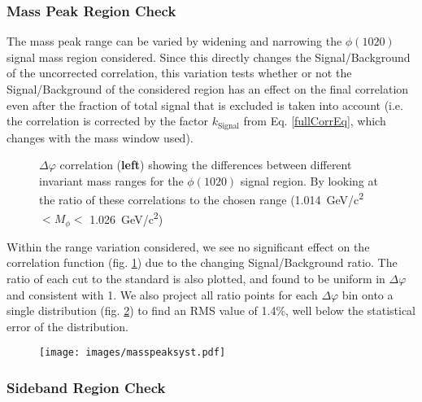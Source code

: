 \documentclass[ALICE,manyauthors]{ALICE_analysis_notes}
\begin{document}
\subsubsection{Mass Peak Region Check} 

The mass peak range can be varied by widening and narrowing the $\phi(1020)$ signal mass region considered. Since this directly changes the Signal/Background of the uncorrected correlation, this variation tests whether or not the Signal/Background of the considered region has an effect on the final correlation even after the fraction of total signal that is excluded is taken into account (i.e. the correlation is corrected by the factor $k_{\text{Signal}}$ from Eq. \ref{fullCorrEq}, which changes with the mass window used).

\begin{figure}[ht]
\centering
\begin{subfigure}{
\texttt{[image: images/masspeakdphi.pdf]}}
\end{subfigure}
\begin{subfigure}{
\texttt{[image: images/masspeakratios.pdf]}}
\end{subfigure}
\caption{$\Delta\varphi$ correlation (\textbf{left}) showing the differences between different invariant mass ranges for the $\phi(1020)$ signal region.  By looking at the ratio of these correlations to the chosen range (\SI{1.014}{GeV/c^2}$ < M_{\phi} <$ \SI{1.026}{GeV/c^2})}
\label{masspeakcheck}
\end{figure}

Within the range variation considered, we see no significant effect on the correlation function (fig. \ref{masspeakcheck}) due to the changing Signal/Background ratio. The ratio of each cut to the standard is also plotted, and found to be uniform in $\Delta\varphi$ and consistent with 1.  We also project all ratio points for each $\Delta\varphi$ bin onto a single distribution (fig. \ref{masspeakRMS}) to find an RMS value of 1.4\%, well below the statistical error of the distribution.

\begin{figure}[ht]
\centering
\texttt{[image: images/masspeaksyst.pdf]}
\caption{ }
\label{masspeakRMS}
\end{figure}


\subsubsection{Sideband Region Check}
\end{document}
